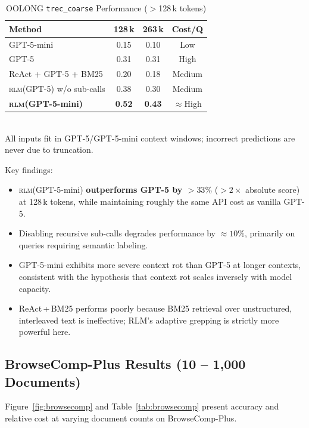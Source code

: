 \documentclass[journal, 10pt, letterpaper]{IEEEtran}
\newcommand{\RLM}[1]{\textsc{rlm}(#1)}
\begin{document}
\begin{table}[!t]
  \caption{OOLONG \texttt{trec\_coarse} Performance ($>$128\,k tokens)}
  \label{tab:oolong}
  \centering
  \begin{tabular}{lccc}
    \toprule
    \textbf{Method} & \textbf{128\,k} & \textbf{263\,k} & \textbf{Cost/Q} \\
    \midrule
    GPT-5-mini                & 0.15 & 0.10 & Low \\
    GPT-5                     & 0.31 & 0.31 & High \\
    ReAct + GPT-5 + BM25      & 0.20 & 0.18 & Medium \\
    \RLM{GPT-5} w/o sub-calls & 0.38 & 0.30 & Medium \\
    \textbf{\RLM{GPT-5-mini}} & \textbf{0.52} & \textbf{0.43} & $\approx$High \\
    \bottomrule
  \end{tabular}\\[3pt]
  \footnotesize All inputs fit in GPT-5/GPT-5-mini context windows;
  incorrect predictions are never due to truncation.
\end{table}

Key findings:
\begin{itemize}
  \item \RLM{GPT-5-mini} \textbf{outperforms GPT-5 by $>33\%$} ($>2\times$
    absolute score) at 128\,k tokens, while maintaining roughly the same API
    cost as vanilla GPT-5.
  \item Disabling recursive sub-calls degrades performance by $\approx10\%$,
    primarily on queries requiring semantic labeling.
  \item GPT-5-mini exhibits more severe context rot than GPT-5 at longer
    contexts, consistent with the hypothesis that context rot scales inversely
    with model capacity.
  \item ReAct\,+\,BM25 performs poorly because BM25 retrieval over
    unstructured, interleaved text is ineffective; RLM's adaptive grepping
    is strictly more powerful here.
\end{itemize}

\subsection{BrowseComp-Plus Results (10 -- 1{,}000 Documents)}

Figure~\ref{fig:browsecomp} and Table~\ref{tab:browsecomp} present accuracy
and relative cost at varying document counts on BrowseComp-Plus.
\end{document}
